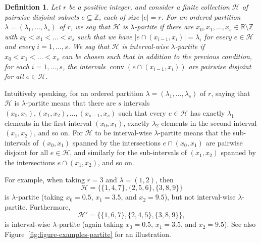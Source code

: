 \documentclass[11pt]{article}
\newtheorem{definition}[theorem]{Definition}
\theoremstyle{definition}
\numberwithin{equation}{section}
\numberwithin{figure}{section}
\newcommand{\su}{\subseteq}
\newcommand{\Z}{\mathbb{Z}}
\newcommand{\HH}{\mathcal{H}}
\newcommand{\conv}{\operatorname{conv}}
\begin{document}
\begin{definition}\label{def-s-partite}
    Let $r$ be a positive integer, and consider a finite collection $\HH$ of pairwise disjoint subsets $e\su \Z$, each of size $|e|=r$. For an ordered partition $\lambda=(\lambda_1,\dots,\lambda_s)$ of $r$, we say that $\HH$ is \emph{$\lambda$-partite} if there are $x_0,x_1,\dots,x_{s}\in\mathbb{R}\setminus\Z$ with $x_0<x_1<\dots<x_{s}$ such that we have $|e\cap (x_{i-1},x_i)|=\lambda_i$ for every $e\in \HH$ and every $i=1,\dots,s$. We say that $\HH$ is \emph{interval-wise $\lambda$-partite} if $x_0<x_1<\dots<x_{s}$ can be chosen such that in addition to the previous condition, for each $i=1,\dots,s$, the intervals $\conv(e\cap (x_{i-1},x_i))$  are pairwise disjoint for all $e\in \HH$.
\end{definition}

Intuitively speaking, for an ordered partition $\lambda=(\lambda_1,\dots,\lambda_s)$ of $r$, saying that $\HH$ is $\lambda$-partite means that there are $s$ intervals $(x_0,x_1),(x_1,x_2),\dots,(x_{s-1},x_s)$ such that every $e\in \HH$ has exactly $\lambda_1$ elements in the first interval $(x_0,x_1)$, exactly $\lambda_2$ elements in the second interval $(x_1,x_2)$, and so on. For $\HH$ to be interval-wise $\lambda$-partite means that the sub-intervals of $(x_0,x_1)$ spanned by the intersections $e\cap (x_0,x_1)$ are pairwise disjoint for all $e\in \HH$, and similarly for the sub-intervals of $(x_1,x_2)$ spanned by the intersections $e\cap (x_1,x_2)$, and so on.

For example, when taking $r=3$ and $\lambda=(1,2)$, then
\[
\HH = \{ \{1,4,7\}, \{2, 5,6\}, \{3,8,9\} \}
\]
is $\lambda$-partite (taking $x_0=0.5$, $x_1 = 3.5$, and $x_2 = 9.5$), but not interval-wise $\lambda$-partite. Furthermore,
\[
\mathcal H' = \{\{1,6,7\}, \{2, 4,5\}, \{3,8,9\}\},
\]
is interval-wise $\lambda$-partite (again taking $x_0=0.5$, $x_1 = 3.5$, and $x_2 = 9.5$). See also Figure~\ref{fig:figure-examples-partite} for an illustration.
\end{document}
